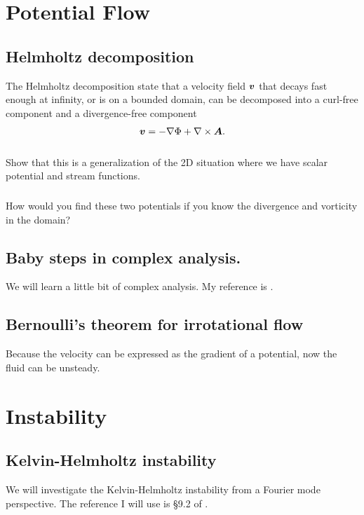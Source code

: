\documentclass[11pt,letterpaper]{report}
\begin{document}
\chapter{Potential Flow}
\section{Helmholtz decomposition}
The Helmholtz decomposition state that a velocity field $\boldsymbol{v}$ that decays fast enough at infinity, or is on a bounded domain, can be decomposed into a curl-free component and a divergence-free component \parencite{Petrascheck_15}
\begin{align}
    \boldsymbol{v} = -\nabla\Phi+\nabla\times \boldsymbol{A}. 
\end{align}

\subsection{}
Show that this is a generalization of the 2D situation where we have scalar potential and stream functions. 

\subsection{}
How would you find these two potentials if you know the divergence and vorticity in the domain?

\section{Baby steps in complex analysis. }
We will learn a little bit of complex analysis. My reference is \cite{SteinShakarchi_10}. 

\section{Bernoulli's theorem for irrotational flow}
Because the velocity can be expressed as the gradient of a potential, now the fluid can be unsteady. 

\chapter{Instability}
\section{Kelvin-Helmholtz instability}
We will investigate the Kelvin-Helmholtz instability from a Fourier mode perspective. The reference I will use is \S9.2 of \cite{Vallis_17}.
\end{document}
